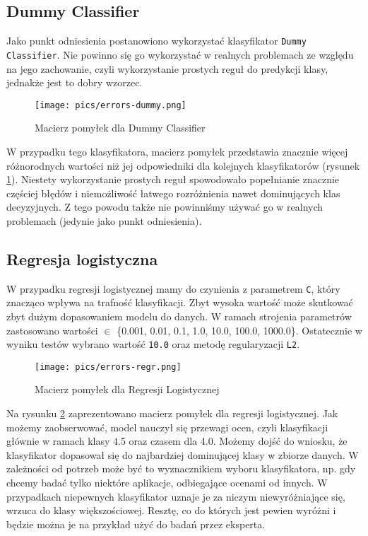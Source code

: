 \documentclass{article}
\begin{document}
\subsection{Dummy Classifier}
Jako punkt odniesienia postanowiono wykorzystać klasyfikator \texttt{Dummy Classifier}. Nie powinno się go wykorzystać w realnych problemach ze względu na jego zachowanie, czyli wykorzystanie prostych reguł do predykcji klasy, jednakże jest to dobry wzorzec.

\begin{figure}[!h]
\centering
    \texttt{[image: pics/errors-dummy.png]}
    \caption{Macierz pomyłek dla Dummy Classifier}
    \label{fig:errors-dummy}
\end{figure}

W przypadku tego klasyfikatora, macierz pomyłek przedstawia znacznie więcej różnorodnych wartości niż jej odpowiedniki dla kolejnych klasyfikatorów (rysunek \ref{fig:errors-dummy}). Niestety wykorzystanie prostych reguł spowodowało popełnianie znacznie częściej błędów i niemożliwość łatwego rozróżnienia nawet dominujących klas decyzyjnych. Z tego powodu także nie powinniśmy używać go w realnych problemach (jedynie jako punkt odniesienia).

\subsection{Regresja logistyczna}
W przypadku regresji logistycznej mamy do czynienia z parametrem \texttt{C}, który znacząco wpływa na trafność klasyfikacji. Zbyt wysoka wartość może skutkować zbyt dużym dopasowaniem modelu do danych. W ramach strojenia parametrów zastosowano wartości $\in$ \{0.001, 0.01, 0.1, 1.0, 10.0, 100.0, 1000.0\}. Ostatecznie w wyniku testów wybrano wartość \texttt{10.0} oraz metodę regularyzacji \texttt{L2}.

\begin{figure}[!h]
\centering
    \texttt{[image: pics/errors-regr.png]}
    \caption{Macierz pomyłek dla Regresji Logistycznej}
    \label{fig:errors-regresja-logistyczna}
\end{figure}

Na rysunku \ref{fig:errors-regresja-logistyczna} zaprezentowano macierz pomyłek dla regresji logistycznej. Jak możemy zaobserwować, model nauczył się przewagi ocen, czyli klasyfikacji głównie w ramach klasy 4.5 oraz czasem dla 4.0. Możemy dojść do wniosku, że klasyfikator dopasował się do najbardziej dominującej klasy w zbiorze danych. W zależności od potrzeb może być to wyznacznikiem wyboru klasyfikatora, np. gdy chcemy badać tylko niektóre aplikacje, odbiegające ocenami od innych. W przypadkach niepewnych klasyfikator uznaje je za niczym niewyróżniające się, wrzuca do klasy większościowej. Resztę, co do których jest pewien wyróżni i będzie można je na przykład użyć do badań przez eksperta.
\end{document}
